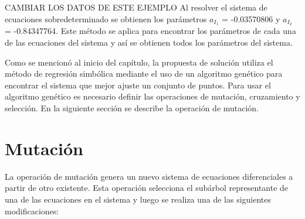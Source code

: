 CAMBIAR LOS DATOS DE ESTE EJEMPLO
Al resolver el sistema de ecuaciones sobredeterminado se obtienen los parámetros $a_{I_1}$ = -0.03570806 y $a_{I_2}$ = -0.84347764. Este método se aplica para encontrar los parámetros de cada una de las ecuaciones del sistema y así se obtienen todos los parámetros del sistema.

Como se mencionó al inicio del capítulo, la propuesta de solución utiliza el método de regresión simbólica mediante el uso de un algoritmo genético para encontrar el sistema que mejor ajuste un conjunto de puntos. Para usar el algoritmo genético es necesario definir las operaciones de mutación, cruzamiento y selección. En la siguiente sección se describe la operación de mutación.

\section{Mutación}\label{section:mutation}

La operación de mutación genera un nuevo sistema de ecuaciones diferenciales a partir de otro existente. Esta operación selecciona el subárbol representante de una de las ecuaciones en el sistema y luego se realiza una de las siguientes modificaciones:

